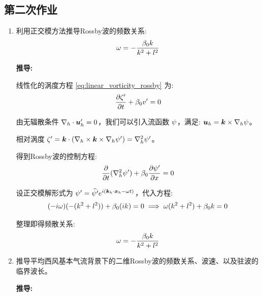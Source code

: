 \subsection*{第二次作业}

\begin{enumerate}

    \item 利用正交模方法推导Rossby波的频数关系:
    \begin{equation*}
        \omega = -\frac{\beta_0 k}{k^2 + l^2}
    \end{equation*}

    \vspace{1em}
    \textbf{推导:}

    线性化的涡度方程 \eqref{eq:linear_vorticity_rossby} 为:
    \begin{equation*}
        \pde{\relvort^\prime}{\timevar} + \rossby_0 v^\prime = 0
    \end{equation*}

    由无辐散条件 $\nabla_h \cdot \bm{u}_h^\prime = 0$，我们可以引入流函数 $\psi$，满足: $\bm{u}_h = \bm{k} \times \nabla_h \psi$。

    相对涡度 $\zeta^\prime = \bm{k} \cdot (\nabla_h \times \bm{k} \times \nabla_h \psi^\prime) = \nabla_h^2 \psi^\prime$。

    得到Rossby波的控制方程:
    \begin{equation*}
        \pde{}{\timevar} (\nabla_h^2 \streamfunc^\prime) + \rossby_0 \pde{\streamfunc^\prime}{x} = 0
    \end{equation*}

    设正交模解形式为 $\psi^\prime = \widehat{\psi^\prime} e^{i (\bm{k}_h \cdot \bm{x}_h - \omega t)}$，代入方程:
    \begin{equation*}
        (-i \omega)(-(k^2 + l^2)) + \beta_0 (i k) = 0 \implies \omega (k^2 + l^2) + \beta_0 k = 0
    \end{equation*}

    整理即得频散关系:
    \begin{equation*}
        \omega = -\frac{\beta_0 k}{k^2 + l^2}
    \end{equation*}

    \item 推导平均西风基本气流背景下的二维Rossby波的频数关系、波速、以及驻波的临界波长。

    \vspace{1em}
    \textbf{推导:}


\end{enumerate}
